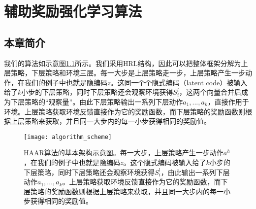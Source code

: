 %
%
%
%
%
%
%
%
%
%
%
%
%

\chapter{辅助奖励强化学习算法}

\section{本章简介}
我们的算法如示意图\ref{fig:algorithm_scheme}所示。我们采用HRL结构，因此可以把整体框架分解为上层策略，下层策略和环境三层。每一大步是上层策略走一步，上层策略产生一步动作，在我们的例子中也就是隐编码$z$。这同一个个隐式编码（latent code）被输入给了$k$小步的下层策略，同时下层策略还会观察环境获得$S_i^l$，这两个向量合并后成为下层策略的``观察量''。由此下层策略输出一系列下层动作$a_1, ..., a_k$，直接作用于环境。上层策略获取环境反馈直接作为它的奖励函数，而下层策略的奖励函数则根据上层策略来获取，并且同一大步内的每一小步获得相同的奖励值。

\begin{figure}[H] %
  \centering
  \texttt{[image: algorithm\_scheme]}
  \caption{HAAR算法的基本架构示意图。每一大步，上层策略产生一步动作$a^h$，在我们的例子中也就是隐编码$z$。这个隐式编码被输入给了$k$小步的下层策略，同时下层策略还会观察环境获得$S_i^l$，由此输出一系列下层动作$a_1, ..., a_k$。上层策略获取环境反馈直接作为它的奖励函数，而下层策略的奖励函数则根据上层策略来获取，并且同一大步内的每一小步获得相同的奖励值。}
  \label{fig:algorithm_scheme}
\end{figure}


